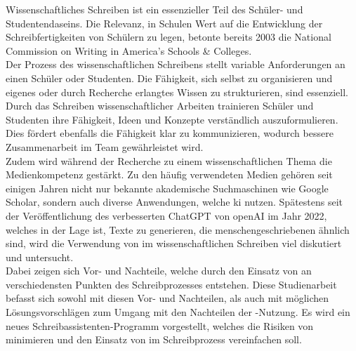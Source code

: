 \documentclass[../main.tex]{subfiles}
\begin{document}
Wissenschaftliches Schreiben ist ein essenzieller Teil des Schüler- und Studentendaseins. 
Die Relevanz, in Schulen Wert auf die Entwicklung der Schreibfertigkeiten von Schülern zu legen, betonte bereits 2003 
die National Commission on Writing in America’s Schools \& Colleges\cite{nationalcommissionwriting}.  \\ Der Prozess des 
wissenschaftlichen Schreibens stellt variable Anforderungen an einen Schüler oder Studenten. Die Fähigkeit, sich selbst zu organisieren und 
eigenes oder durch Recherche erlangtes Wissen zu strukturieren, sind essenziell. Durch das Schreiben 
wissenschaftlicher Arbeiten trainieren Schüler und Studenten ihre Fähigkeit, Ideen und Konzepte verständlich 
auszuformulieren. Dies fördert ebenfalls die Fähigkeit klar zu kommunizieren, wodurch bessere Zusammenarbeit 
im Team gewährleistet wird.\cite{nationalcommissionwriting,teachers,humanWritingToAi} \\ 
Zudem wird während der Recherche zu einem wissenschaftlichen Thema die Medienkompetenz gestärkt. Zu den häufig 
verwendeten Medien gehören seit einigen Jahren nicht nur bekannte akademische Suchmaschinen wie Google Scholar, sondern auch 
diverse Anwendungen, welche \gls{ki} nutzen. Spätestens seit der Veröffentlichung des verbesserten ChatGPT von openAI im Jahr 2022, welches in der 
Lage ist, Texte zu generieren, die menschengeschriebenen ähnlich sind, wird die Verwendung von  
im wissenschaftlichen Schreiben viel diskutiert und untersucht.\cite{humanWritingToAi,ZukunftWissenschaftlichesPublizieren}\\
Dabei zeigen sich Vor- und Nachteile, welche durch den Einsatz von  an verschiedensten Punkten des Schreibprozesses entstehen. 
Diese Studienarbeit befasst sich sowohl mit diesen Vor- und Nachteilen, als auch mit möglichen
Lösungsvorschlägen zum Umgang mit den Nachteilen der -Nutzung. Es wird ein neues Schreibassistenten-Programm vorgestellt, welches die Risiken 
von  minimieren und den Einsatz von  im Schreibprozess vereinfachen soll.
\end{document}
